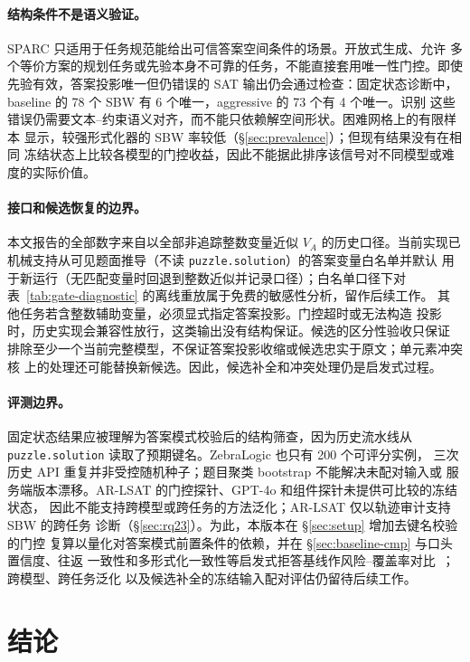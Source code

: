 \documentclass[letterpaper]{article}
\newcommand{\method}{SPARC}
\newcommand{\sbw}{SBW}
\begin{document}
\paragraph{结构条件不是语义验证。}
\method{} 只适用于任务规范能给出可信答案空间条件的场景。开放式生成、允许
多个等价方案的规划任务或先验本身不可靠的任务，不能直接套用唯一性门控。即使
先验有效，答案投影唯一但仍错误的 SAT 输出仍会通过检查：固定状态诊断中，
baseline 的 78 个 \sbw{} 有 6 个唯一，aggressive 的 73 个有 4 个唯一。识别
这些错误仍需要文本--约束语义对齐，而不能只依赖解空间形状。困难网格上的有限样本
显示，较强形式化器的 \sbw{} 率较低（\S\ref{sec:prevalence}）；但现有结果没有在相同
冻结状态上比较各模型的门控收益，因此不能据此排序该信号对不同模型或难度的实际价值。

\paragraph{接口和候选恢复的边界。}
本文报告的全部数字来自以全部非追踪整数变量近似 $V_A$ 的历史口径。当前实现已
机械支持从可见题面推导（不读 \texttt{puzzle.solution}）的答案变量白名单并默认
用于新运行（无匹配变量时回退到整数近似并记录口径）；白名单口径下对
表~\ref{tab:gate-diagnostic} 的离线重放属于免费的敏感性分析，留作后续工作。
其他任务若含整数辅助变量，必须显式指定答案投影。门控超时或无法构造
投影时，历史实现会兼容性放行，这类输出没有结构保证。候选的区分性验收只保证
排除至少一个当前完整模型，不保证答案投影收缩或候选忠实于原文；单元素冲突核
上的处理还可能替换新候选。因此，候选补全和冲突处理仍是启发式过程。

\paragraph{评测边界。}
固定状态结果应被理解为答案模式校验后的结构筛查，因为历史流水线从
\texttt{puzzle.solution} 读取了预期键名。ZebraLogic 也只有 200 个可评分实例，
三次历史 API 重复并非受控随机种子；题目聚类 bootstrap 不能解决未配对输入或
服务端版本漂移。AR-LSAT 的门控探针、GPT-4o 和组件探针未提供可比较的冻结状态，
因此不能支持跨模型或跨任务的方法泛化；AR-LSAT 仅以轨迹审计支持 SBW 的跨任务
诊断（\S\ref{sec:rq23}）。为此，本版本在 \S\ref{sec:setup} 增加去键名校验的门控
复算以量化对答案模式前置条件的依赖，并在 \S\ref{sec:baseline-cmp} 与口头置信度、往返
一致性和多形式化一致性等启发式拒答基线作风险--覆盖率对比~\cite{hall2026,singh2026}；跨模型、跨任务泛化
以及候选补全的冻结输入配对评估仍留待后续工作。

\section{结论}
\label{sec:conclusion}
\end{document}
